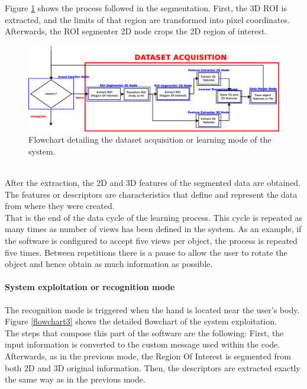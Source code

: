 Figure \ref{flowchart2} shows the process followed in the segmentation. 
First, the 3D ROI is extracted, and the limits of that region are transformed into pixel coordinates. 
Afterwards, the ROI segmenter 2D node crops the 2D region of interest. 
\begin{figure}[H]
	\begin{center}
\includegraphics[width=\linewidth]{img/diagrams/flowchart2.eps}
	\caption[Dataset acquisition flowchart]{Flowchart detailing the dataset acquisition or learning mode of the system.}
		\label{flowchart2}

	\end{center}
\end{figure}


\\

After the extraction, the 2D and 3D features of the segmented data are obtained. The features or descriptors are characteristics that define and represent the data from where they were created. 
\\
That is the end of the data cycle of the learning process. 
This cycle is repeated as many times as number of views has been defined in the system. 
As an example, if the software is configured to accept five views per object, the process is repeated five times. 
Between repetitions there is a pause to allow the user to rotate the object and hence obtain as much information as possible. 


\paragraph{System exploitation or recognition mode}\mbox{}


The recognition mode is triggered when the hand is located near the user's body. 
Figure \ref{flowchart3} shows the detailed flowchart of the system exploitation. 
\\
The steps that compose this part of the software are the following: 
First, the input information is converted to the custom message used within the code. Afterwards, as in the previous mode, the Region Of Interest is segmented from both 2D and 3D original information. Then, the descriptors are extracted exactly the same way as in the previous mode. 
\\

